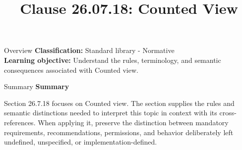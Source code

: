 \documentclass[10pt,letterpaper]{article}
\title{Clause 26.07.18: Counted View}
\author{}
\date{}
\begin{document}
\maketitle
\begin{CornellOverviewBox}{Overview}
\textbf{Classification:} Standard library - Normative\\[2pt]
\textbf{Learning objective:} Understand the rules, terminology, and semantic consequences associated with Counted view.
\end{CornellOverviewBox}\begin{CornellSummaryBox}{Summary}
{\sffamily\bfseries\color{Accent} Summary}\par\vspace{3pt}Section 26.7.18 focuses on Counted view. The section supplies the rules and semantic distinctions needed to interpret this topic in context with its cross-references. When applying it, preserve the distinction between mandatory requirements, recommendations, permissions, and behavior deliberately left undefined, unspecified, or implementation-defined.
\end{CornellSummaryBox}
\end{document}
